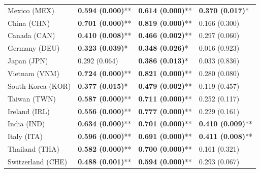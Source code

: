 \begin{longtable}{p{5cm}p{3cm}p{3cm}p{5cm}}
Mexico (MEX) & \textcolor{atlLime600}{\textbf{0.594 (0.000)}**} & \textcolor{atlLime600}{\textbf{0.614 (0.000)}**} & \textcolor{atlLime600}{\textbf{0.370 (0.017)}*} \\
China (CHN) & \textcolor{atlLime600}{\textbf{0.701 (0.000)}**} & \textcolor{atlLime600}{\textbf{0.819 (0.000)}**} & \textcolor{atlOrange600}{0.166 (0.300)} \\
Canada (CAN) & \textcolor{atlLime600}{\textbf{0.410 (0.008)}**} & \textcolor{atlLime600}{\textbf{0.466 (0.002)}**} & \textcolor{atlOrange600}{0.297 (0.060)} \\
Germany (DEU) & \textcolor{atlLime600}{\textbf{0.323 (0.039)}*} & \textcolor{atlLime600}{\textbf{0.348 (0.026)}*} & \textcolor{atlOrange600}{0.016 (0.923)} \\
Japan (JPN) & \textcolor{atlOrange600}{0.292 (0.064)} & \textcolor{atlLime600}{\textbf{0.386 (0.013)}*} & \textcolor{atlOrange600}{0.033 (0.836)} \\
Vietnam (VNM) & \textcolor{atlLime600}{\textbf{0.724 (0.000)}**} & \textcolor{atlLime600}{\textbf{0.821 (0.000)}**} & \textcolor{atlOrange600}{0.280 (0.080)} \\
South Korea (KOR) & \textcolor{atlLime600}{\textbf{0.377 (0.015)}*} & \textcolor{atlLime600}{\textbf{0.479 (0.002)}**} & \textcolor{atlOrange600}{0.119 (0.457)} \\
Taiwan (TWN) & \textcolor{atlLime600}{\textbf{0.587 (0.000)}**} & \textcolor{atlLime600}{\textbf{0.711 (0.000)}**} & \textcolor{atlOrange600}{0.252 (0.117)} \\
Ireland (IRL) & \textcolor{atlLime600}{\textbf{0.556 (0.000)}**} & \textcolor{atlLime600}{\textbf{0.777 (0.000)}**} & \textcolor{atlOrange600}{0.229 (0.161)} \\
India (IND) & \textcolor{atlLime600}{\textbf{0.634 (0.000)}**} & \textcolor{atlLime600}{\textbf{0.701 (0.000)}**} & \textcolor{atlLime600}{\textbf{0.410 (0.009)}**} \\
Italy (ITA) & \textcolor{atlLime600}{\textbf{0.596 (0.000)}**} & \textcolor{atlLime600}{\textbf{0.691 (0.000)}**} & \textcolor{atlLime600}{\textbf{0.411 (0.008)}**} \\
Thailand (THA) & \textcolor{atlLime600}{\textbf{0.582 (0.000)}**} & \textcolor{atlLime600}{\textbf{0.700 (0.000)}**} & \textcolor{atlOrange600}{0.161 (0.321)} \\
Switzerland (CHE) & \textcolor{atlLime600}{\textbf{0.488 (0.001)}**} & \textcolor{atlLime600}{\textbf{0.594 (0.000)}**} & \textcolor{atlOrange600}{0.293 (0.067)} \\

\end{longtable}
